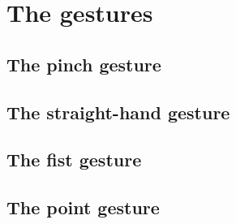 \section{The gestures}
\subsection{The pinch gesture}
\subsection{The straight-hand gesture}
\subsection{The fist gesture}
\subsection{The point gesture}